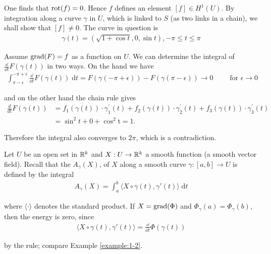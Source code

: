 One finds that $\operatorname{rot}(f) = 0$. Hence $f$ defines an element $[f] \in H^1(U)$. By
integration along a curve $\gamma$ in $U$, which is linked to $S$ (as two links in a chain),
we shall show that $[f] \neq 0$. The curve in question is
\begin{align*}
  \gamma(t) = \left(\sqrt{1+\cos t}, 0, \sin t\right), -\pi\le t\le \pi
\end{align*}

Assume $\operatorname{grad}(F) = f$ as a function on $U$. We can determine the integral of 
$\frac{\dd }{\dd t}F(\gamma(t))$ in two ways. On the hand we have
\begin{align*}
  \int_{\pi-\epsilon}^{-\pi+\epsilon}{\frac{\dd }{\dd t}F(\gamma(t)) \;\mathrm{d}t}
  = F(\gamma(-\pi+\epsilon)) - F(\gamma(\pi-\epsilon))
  \to 0\qquad \text{ for } \epsilon\to 0
\end{align*}

and on the other hand the chain rule gives
\begin{align*}
  \frac{d}{dt}F(\gamma(t))
  & = f_{1}(\gamma(t)) \cdot\gamma_{1}^{\prime}(t)+f_{2}(\gamma(t))\cdot\gamma_{2}^{\prime}(t)+f_{3}(\gamma(t))\cdot \gamma_{3}^{\prime}(t) \\
  & = \sin^{2}t+0+\cos^{2}\mathrm{t}=1.
\end{align*}

Therefore the integral also converges to $2\pi$, which is a contradiction.

\begin{example}\label{example:1-8}
  Let $U$ be an open set in ${\mathbb{R}}^k$ and $X: U\to {\ensuremath{\mathbb{R}}}^k$ a smooth function (a smooth vector field). 
Recall that the  $A_\gamma(X)$, of $X$ along a smooth curve $\gamma: [a, b]\to U$ is 
defined by the integral
\begin{align*}
  A_\gamma(X) = \int_{a}^{b}{\langle X\circ \gamma(t), \gamma'(t)\rangle\;\mathrm{d}t}
\end{align*}

where $\langle\cdot\rangle$ denotes the standard product. If $X = \operatorname{grad}(\Phi)$ and $\Phi_\gamma(a) = \Phi_\gamma(b)$,
then the energy is zero, since 
\begin{align*}
  \langle X\circ \gamma(t), \gamma'(t)\rangle = \frac{\dd }{\dd t}\Phi(\gamma(t))
\end{align*}

by the rule; compare Example \ref{example:1-2}.
\end{example}
